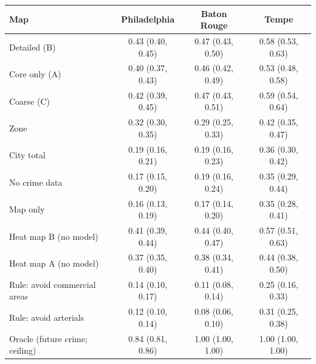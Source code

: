 \begin{tabular}{lccc}
\toprule
Map & Philadelphia & Baton Rouge & Tempe \\
\midrule
Detailed (B) & 0.43 (0.40, 0.45) & 0.47 (0.43, 0.50) & 0.58 (0.53, 0.63) \\
Core only (A) & 0.40 (0.37, 0.43) & 0.46 (0.42, 0.49) & 0.53 (0.48, 0.58) \\
Coarse (C) & 0.42 (0.39, 0.45) & 0.47 (0.43, 0.51) & 0.59 (0.54, 0.64) \\
Zone & 0.32 (0.30, 0.35) & 0.29 (0.25, 0.33) & 0.42 (0.35, 0.47) \\
City total & 0.19 (0.16, 0.21) & 0.19 (0.16, 0.23) & 0.36 (0.30, 0.42) \\
No crime data & 0.17 (0.15, 0.20) & 0.19 (0.16, 0.24) & 0.35 (0.29, 0.44) \\
Map only & 0.16 (0.13, 0.19) & 0.17 (0.14, 0.20) & 0.35 (0.28, 0.41) \\
Heat map B (no model) & 0.41 (0.39, 0.44) & 0.44 (0.40, 0.47) & 0.57 (0.51, 0.63) \\
Heat map A (no model) & 0.37 (0.35, 0.40) & 0.38 (0.34, 0.41) & 0.44 (0.38, 0.50) \\
Rule: avoid commercial areas & 0.14 (0.10, 0.17) & 0.11 (0.08, 0.14) & 0.25 (0.16, 0.33) \\
Rule: avoid arterials & 0.12 (0.10, 0.14) & 0.08 (0.06, 0.10) & 0.31 (0.25, 0.38) \\
Oracle (future crime; ceiling) & 0.84 (0.81, 0.86) & 1.00 (1.00, 1.00) & 1.00 (1.00, 1.00) \\
\bottomrule
\end{tabular}
